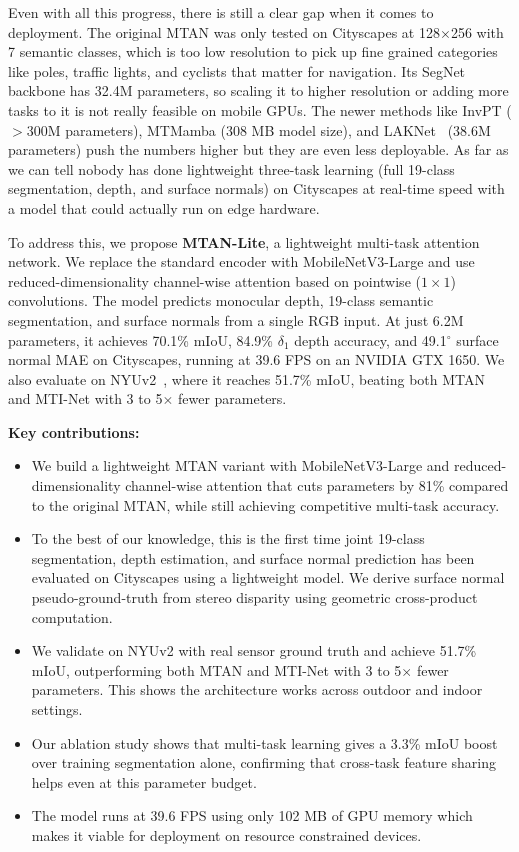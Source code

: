 \documentclass[journal, onecolumn]{IEEEtran}
\begin{document}
Even with all this progress, there is still a clear gap when it comes to deployment. The original MTAN was only tested on Cityscapes at 128$\times$256 with 7 semantic classes, which is too low resolution to pick up fine grained categories like poles, traffic lights, and cyclists that matter for navigation. Its SegNet backbone has 32.4M parameters, so scaling it to higher resolution or adding more tasks to it is not really feasible on mobile GPUs. The newer methods like InvPT ($>$300M parameters), MTMamba (308 MB model size), and LAKNet~\cite{laknet2025} (38.6M parameters) push the numbers higher but they are even less deployable. As far as we can tell nobody has done lightweight three-task learning (full 19-class segmentation, depth, and surface normals) on Cityscapes at real-time speed with a model that could actually run on edge hardware.

To address this, we propose \textbf{MTAN-Lite}, a lightweight multi-task attention network. We replace the standard encoder with MobileNetV3-Large and use reduced-dimensionality channel-wise attention based on pointwise ($1 \times 1$) convolutions. The model predicts monocular depth, 19-class semantic segmentation, and surface normals from a single RGB input. At just 6.2M parameters, it achieves 70.1\% mIoU, 84.9\% $\delta_1$ depth accuracy, and 49.1$^\circ$ surface normal MAE on Cityscapes, running at 39.6 FPS on an NVIDIA GTX 1650. We also evaluate on NYUv2~\cite{silberman2012nyu}, where it reaches 51.7\% mIoU, beating both MTAN and MTI-Net with 3 to 5$\times$ fewer parameters.

\noindent \textbf{Key contributions:}
\begin{itemize}
    \item We build a lightweight MTAN variant with MobileNetV3-Large and reduced-dimensionality channel-wise attention that cuts parameters by 81\% compared to the original MTAN, while still achieving competitive multi-task accuracy.
    \item To the best of our knowledge, this is the first time joint 19-class segmentation, depth estimation, and surface normal prediction has been evaluated on Cityscapes using a lightweight model. We derive surface normal pseudo-ground-truth from stereo disparity using geometric cross-product computation.
    \item We validate on NYUv2 with real sensor ground truth and achieve 51.7\% mIoU, outperforming both MTAN and MTI-Net with 3 to 5$\times$ fewer parameters. This shows the architecture works across outdoor and indoor settings.
    \item Our ablation study shows that multi-task learning gives a 3.3\% mIoU boost over training segmentation alone, confirming that cross-task feature sharing helps even at this parameter budget.
    \item The model runs at 39.6 FPS using only 102 MB of GPU memory which makes it viable for deployment on resource constrained devices.
\end{itemize}
\end{document}
